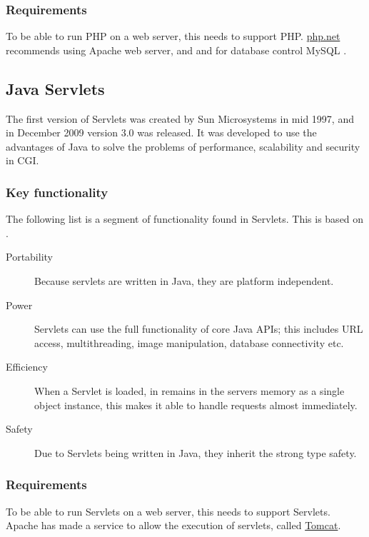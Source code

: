 \subsubsection*{Requirements}

\noindent To be able to run PHP on a web server, this needs to support PHP. \href{http://www.php.net/manual/en/tutorial.requirements.php}{php.net} recommends using Apache web server, and and for database control MySQL \cite{phpReq}.

\subsection*{Java Servlets}
The first version of Servlets was created by Sun Microsystems in mid 1997, and in December 2009 version 3.0 was released\cite{servletHistory}. It was developed to use the advantages of Java to solve the problems of performance, scalability and security in CGI\cite{servletHistory2}.

\subsubsection*{Key functionality}

\noindent The following list is a segment of functionality found in Servlets. This is based on \cite{servletFunctionality}.

\begin{description}
	\item[Portability] Because servlets are written in Java, they are platform independent.
	\item[Power] Servlets can use the full functionality of core Java APIs; this includes URL access, multithreading, image manipulation, database connectivity etc.
	\item[Efficiency] When a Servlet is loaded, in remains in the servers memory as a single object instance, this makes it able to handle requests almost immediately.
	\item[Safety] Due to Servlets being written in Java, they inherit the strong type safety.
\end{description}

\subsubsection*{Requirements}

\noindent To be able to run Servlets on a web server, this needs to support Servlets. Apache has made a service to allow the execution of servlets, called \href{http://tomcat.apache.org/}{Tomcat}.



